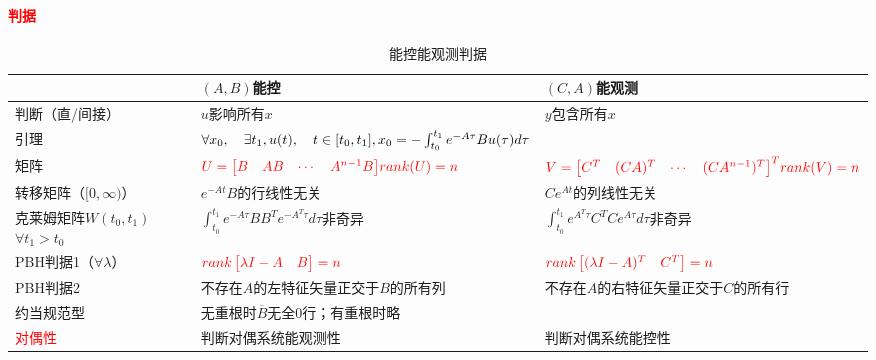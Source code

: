 \documentclass[
12pt, %
a4paper, 
oneside, %
]{scrartcl}
\begin{document}
\paragraph{\textcolor{red}{判据}}
\begin{table}[H]
\centering
\small
\begin{tabular}{|p{3.5cm}|p{6.8cm}|p{6.8cm}|}
\hline
 & $ (A, B) $能控 & $ (C, A) $能观测 \\
\hline
判断（直/间接） & $ u $影响所有$ x $ & $ y $包含所有$ x $ \\ 
\hline
引理 & $ \forall x_0, \quad \exists t_1, u(t), \quad t \in [t_0, t_1], \newline x_0 = -\int_{t_0}^{t_1} e^{-A \tau} B u(\tau) d \tau $ & \\
\hline
矩阵 & $ \textcolor{red}{U = \begin{bmatrix} B & AB & \cdots & A^{n - 1} B \end{bmatrix}} \newline \textcolor{red}{rank(U) = n} $ & $ \textcolor{red}{V = \begin{bmatrix} C^T & (CA)^T & \cdots & (C A^{n - 1})^T \end{bmatrix}^T} \newline \textcolor{red}{rank(V) = n} $ \\
\hline
转移矩阵（$ [0, \infty) $） & $ e^{-At} B $的行线性无关 & $ C e^{At} $的列线性无关 \\
\hline
克莱姆矩阵$ W(t_0, t_1) $ \newline $ \forall t_1 > t_0 $ & $ \int_{t_0}^{t_1} e^{-A \tau} B B^T e^{-A^T \tau} d \tau $非奇异 & $ \int_{t_0}^{t_1} e^{A^T \tau} C^T C e^{A \tau} d \tau $非奇异 \\
\hline
PBH判据1（$ \forall \lambda $） & $ \textcolor{red}{rank \begin{bmatrix} \lambda I - A & B \end{bmatrix} = n} $ & $ \textcolor{red}{rank \begin{bmatrix} (\lambda I - A)^T & C^T \end{bmatrix} = n} $ \\
\hline
PBH判据2 & 不存在$ A $的左特征矢量正交于$ B $的所有列 & 不存在$ A $的右特征矢量正交于$ C $的所有行 \\
\hline
约当规范型 & 无重根时$ \overline{B} $无全$ 0 $行；有重根时略 & \\
\hline
\textcolor{red}{对偶性} & 判断对偶系统能观测性 & 判断对偶系统能控性 \\
\hline
\end{tabular}
\caption{能控能观测判据}
\end{table}
\end{document}
